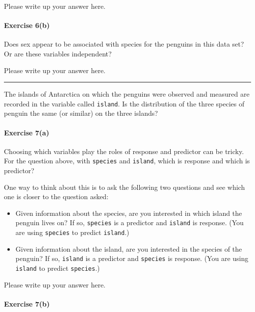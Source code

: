 \documentclass[
]{book}
\providecommand{\tightlist}{%
  \setlength{\itemsep}{0pt}\setlength{\parskip}{0pt}}
\begin{document}
Please write up your answer here.

\hypertarget{exercise-6b}{%
\paragraph{Exercise 6(b)}\label{exercise-6b}}

Does sex appear to be associated with species for the penguins in this data set? Or are these variables independent?

Please write up your answer here.

\begin{center}\rule{0.5\linewidth}{0.5pt}\end{center}

The islands of Antarctica on which the penguins were observed and measured are recorded in the variable called \texttt{island}. Is the distribution of the three species of penguin the same (or similar) on the three islands?

\hypertarget{exercise-7a}{%
\paragraph{Exercise 7(a)}\label{exercise-7a}}

Choosing which variables play the roles of response and predictor can be tricky. For the question above, with \texttt{species} and \texttt{island}, which is response and which is predictor?

One way to think about this is to ask the following two questions and see which one is closer to the question asked:

\begin{itemize}
\tightlist
\item
  Given information about the species, are you interested in which island the penguin lives on? If so, \texttt{species} is a predictor and \texttt{island} is response. (You are using \texttt{species} to predict \texttt{island}.)
\item
  Given information about the island, are you interested in the species of the penguin? If so, \texttt{island} is a predictor and \texttt{species} is response. (You are using \texttt{island} to predict \texttt{species}.)
\end{itemize}

Please write up your answer here.

\hypertarget{exercise-7b}{%
\paragraph{Exercise 7(b)}\label{exercise-7b}}
\end{document}
